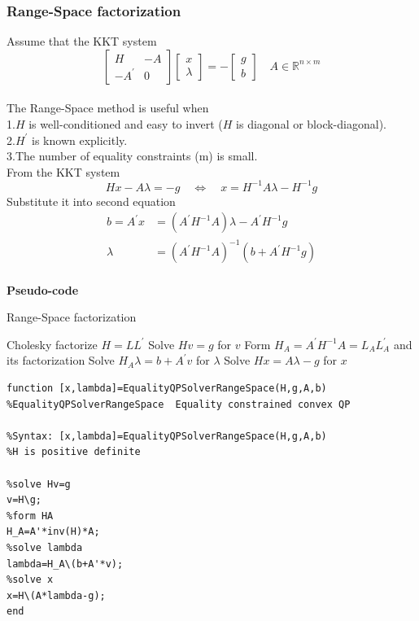 \subsubsection{\bfseries Range-Space factorization}
Assume that the KKT system\\
$$\begin{bmatrix}
H & -A\\
-A^{\prime} & 0
\end{bmatrix}
\begin{bmatrix}
x\\
\lambda
\end{bmatrix}=
-\begin{bmatrix}
g\\
b
\end{bmatrix} \quad A \in \mathbb{R}^{n \times m}$$\\[0.3cm]
The Range-Space method is useful when\\
1.$H$ is well-conditioned and easy to invert ($H$ is diagonal or block-diagonal).\\
2.$H^{\prime}$ is known explicitly.\\
3.The number of equality constraints (m) is small.\\[0.3cm]
From the KKT system
$$Hx-A\lambda=-g \quad \Leftrightarrow \quad x=H^{-1}A\lambda-H^{-1}g$$
Substitute it into second equation
\begin{align*}
b=A^{\prime}x&=\left(A^{\prime}H^{-1}A\right)\lambda-A^{\prime}H^{-1}g\\
\lambda&=\left(A^{\prime}H^{-1}A\right)^{-1}\left(b+A^{\prime}H^{-1}g\right)
\end{align*}\\[0.3cm]
{\setmainfont{Times New Roman}\bfseries Pseudo-code}
\begin{algorithm}[!h]
	\caption{Range-Space factorization}
	\begin{algorithmic}[1]
		\STATE Cholesky factorize $H = LL^{\prime}$
		\STATE Solve $Hv = g$ for $v$
		\STATE Form $H_A = A^{\prime}H^{-1}A = L_AL_A^{\prime}$ and its factorization
		\STATE Solve $H_A\lambda = b + A^{\prime}v$ for $\lambda$
		\STATE Solve $Hx = A\lambda - g$ for $x$
	\end{algorithmic}
\end{algorithm}

{\setmainfont{Courier New Bold} \scriptsize            
\begin{lstlisting}
function [x,lambda]=EqualityQPSolverRangeSpace(H,g,A,b)
%EqualityQPSolverRangeSpace  Equality constrained convex QP

%Syntax: [x,lambda]=EqualityQPSolverRangeSpace(H,g,A,b)
%H is positive definite

%solve Hv=g
v=H\g;
%form HA
H_A=A'*inv(H)*A;
%solve lambda
lambda=H_A\(b+A'*v);
%solve x
x=H\(A*lambda-g);
end
\end{lstlisting}}



